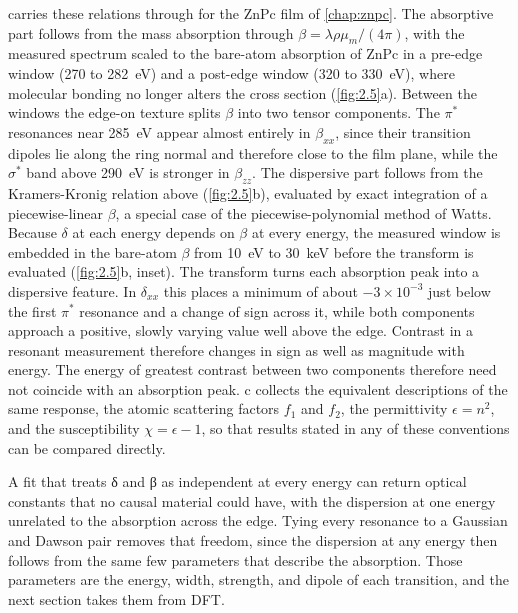  carries these relations through for the ZnPc film of \cref{chap:znpc}. The absorptive part follows from the mass absorption through \(\beta = \lambda\rho\mu_{m}/(4\pi)\),\autocite{attwoodSoftXRaysExtreme1999} with the measured spectrum scaled to the bare-atom absorption of ZnPc\autocite{henkeXRayInteractionsPhotoabsorption1993} in a pre-edge window (270 to \qty{282}{eV}) and a post-edge window (320 to \qty{330}{eV}), where molecular bonding no longer alters the cross section (\cref{fig:2.5}a). Between the windows the edge-on texture splits \(\beta\) into two tensor components. The \(\pi^{*}\) resonances near \qty{285}{eV} appear almost entirely in \(\beta_{xx}\), since their transition dipoles lie along the ring normal and therefore close to the film plane, while the \(\sigma^{*}\) band above \qty{290}{eV} is stronger in \(\beta_{zz}\). The dispersive part follows from the Kramers-Kronig relation above (\cref{fig:2.5}b), evaluated by exact integration of a piecewise-linear \(\beta\), a special case of the piecewise-polynomial method of Watts.\autocite{wattsCalculationKramersKronigTransform2014} Because \(\delta\) at each energy depends on \(\beta\) at every energy, the measured window is embedded in the bare-atom \(\beta\) from \qty{10}{eV} to \qty{30}{keV} before the transform is evaluated (\cref{fig:2.5}b, inset). The transform turns each absorption peak into a dispersive feature. In \(\delta_{xx}\) this places a minimum of about \(- 3 \times 10^{- 3}\) just below the first \(\pi^{*}\) resonance and a change of sign across it, while both components approach a positive, slowly varying value well above the edge. Contrast in a resonant measurement therefore changes in sign as well as magnitude with energy. The energy of greatest contrast between two components therefore need not coincide with an absorption peak. c collects the equivalent descriptions of the same response, the atomic scattering factors \(f_{1}\) and \(f_{2}\), the permittivity \(\epsilon = n^{2}\), and the susceptibility \(\chi = \epsilon - 1\), so that results stated in any of these conventions can be compared directly.\autocite{attwoodSoftXRaysExtreme1999,als-nielsenElementsModernXray2011,yanAccurateFacileDetermination2013}

A fit that treats δ and β as independent at every energy can return optical constants that no causal material could have, with the dispersion at one energy unrelated to the absorption across the edge. Tying every resonance to a Gaussian and Dawson pair removes that freedom, since the dispersion at any energy then follows from the same few parameters that describe the absorption. Those parameters are the energy, width, strength, and dipole of each transition, and the next section takes them from DFT.

